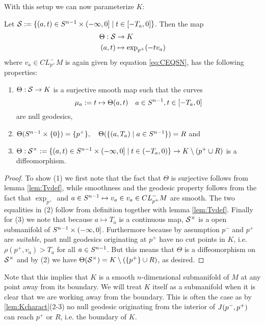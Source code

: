 With this setup we can now parameterize $K$:
\begin{proposition}\label{prop:thetaconstr}
    Let ${\mathcal{S}}:=\{(a,t)\in {S^{n-1}} \times (-\infty,0]\mid t \in [-T_a,0]\}$.
    Then the map
    \begin{align*}
        \Theta:{\mathcal{S}}&\to K\\
        (a,t)&\mapsto \exp_{p^+}(-tv_a)
    \end{align*} where $v_a\in CL^-_{p^+}M$ is again given by equation \ref{eq:CEQSN}, has the following properties:
    \begin{enumerate}[label=\textnormal{(\arabic*)}]
        \item $\Theta:{\mathcal{S}}\to K$ is a surjective smooth map such that the curves 
        \[\mu_a:=t\mapsto\Theta(a,t) \quad a\in {S^{n-1}}, t\in [-T_a,0]\] are null geodesics,
        \item $\Theta(S^{n-1}\times\{0\}) = \{p^+\}, \quad \Theta(\{(a,T_a)\mid a\in {S^{n-1}}\}) = R$ and
        \item $\Theta:{\mathcal{S}}^\times:=\{(a,t)\in {S^{n-1}} \times (-\infty,0]\mid t \in (-T_a,0)\}\to K\setminus ({p^+} \cup R)$ is a diffeomorphism.
    \end{enumerate}
\end{proposition}
\begin{proof}
    To show (1) we first note that the fact that $\Theta$ is surjective follows from lemma \ref{lem:Tvdef}, while smoothness and the geodesic property follows from the fact that $\exp_{p^+}$ and $a\in {S^{n-1}} \mapsto v_a\in v_a\in CL^-_{p^+}M$ are smooth.
    The two equalities in (2) follow from definition together with lemma \ref{lem:Tvdef}.
    Finally for (3) we note that because $a\mapsto T_a$ is a continuous map, ${\mathcal{S}}^\times$ is a open submanifold of ${S^{n-1}}\times (-\infty,0]$. Furthermore because by assumption $p^-$ and $p^+$ are \emph{suitable}, past null geodesics originating at $p^+$ have no cut points in $K$, i.e. $\rho(p^+,v_a)>T_a$ for all $a\in {S^{n-1}}$. But this means that $\Theta$ is a diffeomorphism on ${\mathcal{S}}^\times$ and by (2) we have $\Theta({\mathcal{S}}^\times)=K\setminus (\{p^+\}\cup R)$, as desired.
\end{proof}


Note that this implies that $K$ is a smooth $n$-dimensional submanifold of $M$ at any point away from its boundary. We will treat $K$ itself as a submanifold when it is clear that we are working away from the boundary. This is often the case as by \ref{lem:Kcharact}(2-3) no null geodesic originating from the interior of $J(p^-,p^+)$ can reach $p^+$ or $R$, i.e. the boundary of $K$.

